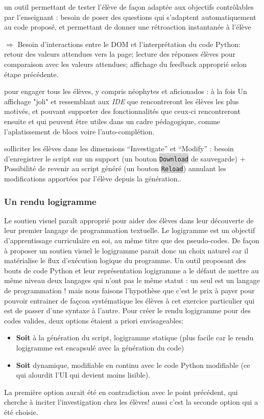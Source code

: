 \documentclass[11pt,a4paper]{article}
\newcommand{\code}[1]{\colorbox{lightgray}{\texttt{\small #1}}}
\begin{document}
un outil permettant de tester l'élève de façon adaptée aux objectifs contrôlables par l'enseignant : besoin de poser des questions qui s'adaptent automatiquement au code proposé, et permettant de donner une rétroaction instantanée à l'élève
\par $\Rightarrow$ Besoin d'interactions entre le DOM et l'interprétation du code Python: retour des valeurs attendues vers la page; lecture des réponses élèves pour comparaison avec les valeurs attendues; affichage du feedback approprié selon étape précédente.

pour engager tous les élèves, y compris néophytes et aficionados : à la fois Un affichage "joli" et ressemblant aux \textit{IDE} que rencontreront les élèves les plus motivés, et pouvant supporter des fonctionnalités que ceux-ci rencontreront ensuite et qui peuvent être utiles dans un cadre pédagogique, comme l'aplatissement de blocs voire l'auto-complétion.

solliciter les élèves dans les dimensions ``Investigate'' et ``Modify'' : besoin d'enregistrer le script sur un support (un bouton \code{Download} de sauvegarde) $+$ Possibilité de revenir au script généré (un bouton \code{Reload}) annulant les modifications apportées par l'élève depuis la génération..

        
\subsubsection{Un rendu logigramme}
Le soutien visuel paraît approprié pour aider des élèves dans leur découverte de leur premier langage de programmation textuelle. Le logigramme est un objectif d'apprentissage curriculaire en soi, au même titre que des pseudo-codes. De façon à proposer un soutien visuel le logigramme parait donc un choix naturel car il matérialise le flux d'exécution logique du programme. Un outil proposant des bouts de code Python et leur représentation logigramme a le défaut de mettre au même niveau deux langages qui n'ont pas le même statut : un seul est un langage de programmation ! mais nous faisons l'hypothèse que c'est le prix à payer pour pouvoir entrainer de façcon systématique les élèves à cet exercice particulier qui est de passer d'une syntaxe à l'autre.
Pour créer le rendu logigramme pour des codes valides, deux options étaient a priori envisageables:\begin{itemize}
    \item \textbf{Soit} à la génération du script, logigramme statique (plus facile car le rendu logigramme est encapsulé avec la génération du code)
    \item \textbf{Soit} dynamique, modifiable en continu avec le code Python modifiable (ce qui alourdit l'UI qui devient moins lisible).
    \end{itemize}
La première option aurait été en contradiction avec le point précédent, qui cherche à inciter l'investigation chez les élèves! aussi c'est la seconde option qui a été choisie.
\end{document}
